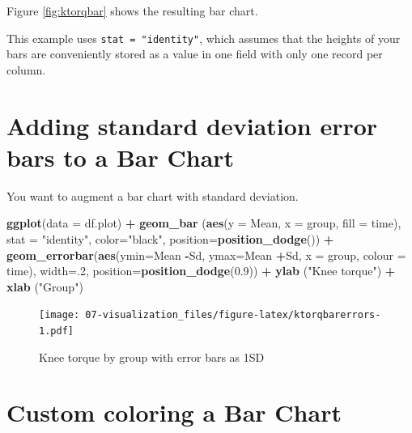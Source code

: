 \documentclass[
]{book}
\newenvironment{Shaded}{\begin{snugshade}}{\end{snugshade}}
\newcommand{\DataTypeTok}[1]{\textcolor[rgb]{0.13,0.29,0.53}{#1}}
\newcommand{\DecValTok}[1]{\textcolor[rgb]{0.00,0.00,0.81}{#1}}
\newcommand{\FloatTok}[1]{\textcolor[rgb]{0.00,0.00,0.81}{#1}}
\newcommand{\KeywordTok}[1]{\textcolor[rgb]{0.13,0.29,0.53}{\textbf{#1}}}
\newcommand{\NormalTok}[1]{#1}
\newcommand{\OperatorTok}[1]{\textcolor[rgb]{0.81,0.36,0.00}{\textbf{#1}}}
\newcommand{\StringTok}[1]{\textcolor[rgb]{0.31,0.60,0.02}{#1}}
\begin{document}
Figure \ref{fig:ktorqbar} shows the resulting bar chart.

This example uses \texttt{stat\ =\ "identity"}, which assumes that the heights of your bars are conveniently stored as a value in one field with only one record per column.

\hypertarget{adding-standard-deviation-error-bars-to-a-bar-chart}{%
\section{Adding standard deviation error bars to a Bar Chart}\label{adding-standard-deviation-error-bars-to-a-bar-chart}}

You want to augment a bar chart with standard deviation.

\begin{Shaded}
\begin{Highlighting}[]
\KeywordTok{ggplot}\NormalTok{(}\DataTypeTok{data =}\NormalTok{ df.plot) }\OperatorTok{+}\StringTok{ }
\KeywordTok{geom_bar}\NormalTok{ (}\KeywordTok{aes}\NormalTok{(}\DataTypeTok{y =}\NormalTok{ Mean, }\DataTypeTok{x =}\NormalTok{ group, }\DataTypeTok{fill =}\NormalTok{ time), }\DataTypeTok{stat =} \StringTok{"identity"}\NormalTok{, }\DataTypeTok{color=}\StringTok{"black"}\NormalTok{, }\DataTypeTok{position=}\KeywordTok{position_dodge}\NormalTok{()) }\OperatorTok{+}
\KeywordTok{geom_errorbar}\NormalTok{(}\KeywordTok{aes}\NormalTok{(}\DataTypeTok{ymin=}\NormalTok{Mean }\OperatorTok{-}\NormalTok{Sd, }\DataTypeTok{ymax=}\NormalTok{Mean }\OperatorTok{+}\NormalTok{Sd, }\DataTypeTok{x =}\NormalTok{ group, }\DataTypeTok{colour =}\NormalTok{ time), }
              \DataTypeTok{width=}\NormalTok{.}\DecValTok{2}\NormalTok{,}
               \DataTypeTok{position=}\KeywordTok{position_dodge}\NormalTok{(}\FloatTok{0.9}\NormalTok{)) }\OperatorTok{+}
\KeywordTok{ylab}\NormalTok{ (}\StringTok{"Knee torque"}\NormalTok{) }\OperatorTok{+}
\KeywordTok{xlab}\NormalTok{ (}\StringTok{"Group"}\NormalTok{)}
\end{Highlighting}
\end{Shaded}

\begin{figure}
\centering
\texttt{[image: 07-visualization\_files/figure-latex/ktorqbarerrors-1.pdf]}
\caption{\label{fig:ktorqbarerrors}Knee torque by group with error bars as 1SD}
\end{figure}

\hypertarget{custom-coloring-a-bar-chart}{%
\section{Custom coloring a Bar Chart}\label{custom-coloring-a-bar-chart}}
\end{document}
